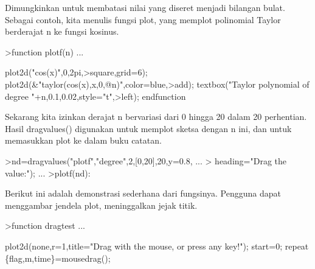\documentclass[a4paper,10pt]{article}
\begin{document}
\begin{eulernotebook}
\begin{eulercomment}
\begin{eulercomment}
\begin{eulercomment}
\begin{eulercomment}
\begin{eulercomment}
\begin{eulercomment}
\begin{eulercomment}
\begin{eulercomment}
\begin{eulercomment}
\begin{eulercomment}
\begin{eulercomment}
\begin{eulercomment}
\begin{eulercomment}
\begin{eulercomment}
\begin{eulercomment}
\begin{eulercomment}
\begin{eulercomment}
\begin{eulercomment}
\begin{eulercomment}
\begin{eulercomment}
\begin{eulercomment}
\begin{eulercomment}
\begin{eulercomment}
\begin{eulercomment}
\begin{eulercomment}
\begin{eulercomment}
\begin{eulercomment}
\begin{eulercomment}
\begin{eulercomment}
\begin{eulercomment}
\begin{eulercomment}
\begin{eulercomment}
\begin{eulercomment}
\begin{eulercomment}
\begin{eulercomment}
\begin{eulercomment}
\begin{eulercomment}
Dimungkinkan untuk membatasi nilai yang diseret menjadi bilangan
bulat. Sebagai contoh, kita menulis fungsi plot, yang memplot
polinomial Taylor berderajat n ke fungsi kosinus.
\end{eulercomment}
\begin{eulerprompt}
>function plotf(n) ...
\end{eulerprompt}
\begin{eulerudf}
  plot2d("cos(x)",0,2pi,>square,grid=6);
  plot2d(&"taylor(cos(x),x,0,@n)",color=blue,>add);
  textbox("Taylor polynomial of degree "+n,0.1,0.02,style="t",>left);
  endfunction
\end{eulerudf}
\begin{eulercomment}
Sekarang kita izinkan derajat n bervariasi dari 0 hingga 20 dalam 20
perhentian. Hasil dragvalues() digunakan untuk memplot sketsa dengan n
ini, dan untuk memasukkan plot ke dalam buku catatan.
\end{eulercomment}
\begin{eulerprompt}
>nd=dragvalues("plotf","degree",2,[0,20],20,y=0.8, ...
> heading="Drag the value:"); ...
>plotf(nd):
\end{eulerprompt}
\begin{eulercomment}
Berikut ini adalah demonstrasi sederhana dari fungsinya. Pengguna
dapat menggambar jendela plot, meninggalkan jejak titik.
\end{eulercomment}
\begin{eulerprompt}
>function dragtest ...
\end{eulerprompt}
\begin{eulerudf}
   plot2d(none,r=1,title="Drag with the mouse, or press any key!");
    start=0;
    repeat
      \{flag,m,time\}=mousedrag();

\end{eulerudf}
\end{eulercomment}
\end{eulercomment}
\end{eulercomment}
\end{eulercomment}
\end{eulercomment}
\end{eulercomment}
\end{eulercomment}
\end{eulercomment}
\end{eulercomment}
\end{eulercomment}
\end{eulercomment}
\end{eulercomment}
\end{eulercomment}
\end{eulercomment}
\end{eulercomment}
\end{eulercomment}
\end{eulercomment}
\end{eulercomment}
\end{eulercomment}
\end{eulercomment}
\end{eulercomment}
\end{eulercomment}
\end{eulercomment}
\end{eulercomment}
\end{eulercomment}
\end{eulercomment}
\end{eulercomment}
\end{eulercomment}
\end{eulercomment}
\end{eulercomment}
\end{eulercomment}
\end{eulercomment}
\end{eulercomment}
\end{eulercomment}
\end{eulercomment}
\end{eulercomment}
\end{eulernotebook}
\end{document}
